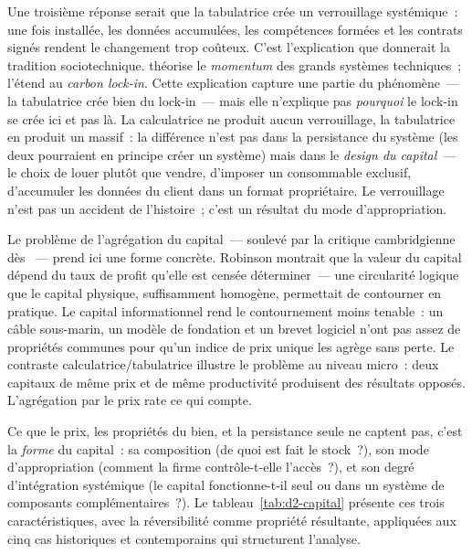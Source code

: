 Une troisième réponse serait que la tabulatrice crée un verrouillage systémique~: une fois installée, les données accumulées, les compétences formées et les contrats signés rendent le changement trop coûteux. C'est l'explication que donnerait la tradition sociotechnique. \textcite{hughes_networks_1983} théorise le \emph{momentum} des grands systèmes techniques~; \textcite{unruh_understanding_2000} l'étend au \emph{carbon lock-in}. Cette explication capture une partie du phénomène~--- la tabulatrice crée bien du lock-in~--- mais elle n'explique pas \emph{pourquoi} le lock-in se crée ici et pas là. La calculatrice ne produit aucun verrouillage, la tabulatrice en produit un massif~: la différence n'est pas dans la persistance du système (les deux pourraient en principe créer un système) mais dans le \emph{design du capital}~--- le choix de louer plutôt que vendre, d'imposer un consommable exclusif, d'accumuler les données du client dans un format propriétaire. Le verrouillage n'est pas un accident de l'histoire~; c'est un résultat du mode d'appropriation.

\markREG
Le problème de l'agrégation du capital~--- soulevé par la critique cambridgienne dès \textcite{robinson_production_1953}~--- prend ici une forme concrète. Robinson montrait que la valeur du capital dépend du taux de profit qu'elle est censée déterminer~--- une circularité logique que le capital physique, suffisamment homogène, permettait de contourner en pratique. Le capital informationnel rend le contournement moins tenable~: un câble sous-marin, un modèle de fondation et un brevet logiciel n'ont pas assez de propriétés communes pour qu'un indice de prix unique les agrège sans perte. Le contraste calculatrice/tabulatrice illustre le problème au niveau micro~: deux capitaux de même prix et de même productivité produisent des résultats opposés. L'agrégation par le prix rate ce qui compte.

Ce que le prix, les propriétés du bien, et la persistance seule ne captent pas, c'est la \emph{forme} du capital~: sa composition (de quoi est fait le stock~?), son mode d'appropriation (comment la firme contrôle-t-elle l'accès~?), et son degré d'intégration systémique (le capital fonctionne-t-il seul ou dans un système de composants complémentaires~?). Le tableau~\ref{tab:d2-capital} présente ces trois caractéristiques, avec la réversibilité comme propriété résultante, appliquées aux cinq cas historiques et contemporains qui structurent l'analyse.

